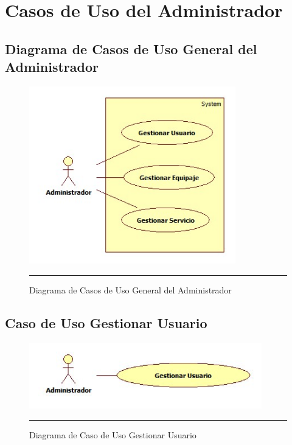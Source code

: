\section{Casos de Uso del Administrador}

\subsection{Diagrama de Casos de Uso General del Administrador}

\begin{figure}[htbp]
	\centering
		\includegraphics[width=0.8\textwidth]{Figuras/general.jpg}
		\rule{30em}{0.5pt}
	\caption[Diagrama de Casos de Uso General del Administrador]{Diagrama de Casos de Uso General del Administrador}
	\label{fig:cuGeneralAdministrador}
\end{figure}

\subsection{Caso de Uso Gestionar Usuario}

\begin{figure}[htbp]
	\centering
		\includegraphics[width=0.9\textwidth]{Figuras/cuGestionarUsuario.png}
		\rule{30em}{0.5pt}
	\caption[Diagrama de Caso de Uso Gestionar Usuario]{Diagrama de Caso de Uso Gestionar Usuario}
	\label{fig:cuGestionarUsuario}
\end{figure}
\clearpage

